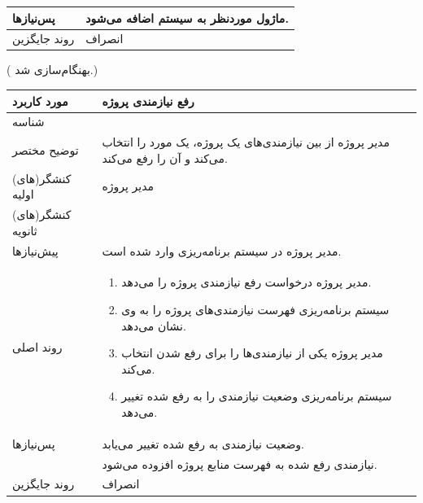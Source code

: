 \begin{table}[H]
\begin{tabular}{|p{3cm}|p{10cm}|}
		پس‌نیازها &
		ماژول موردنظر به سیستم اضافه می‌شود. \\
		
		\hline
		
		روند جایگزین
		& انصراف \\
		\hline
		
	\end{tabular}
\end{table}

({\color{red} بهنگام‌سازی شد.})
\begin{table}[H]
	\centering
	\begin{tabular}{|p{3cm}|p{10cm}|}
		\hline
		
		مورد کاربرد	& رفع نیازمندی پروژه \\
		\hline
		
		شناسه & 
		\stepcounter{usecase_ID}
		
		\arabic{usecase_ID} \\
		
		\hline
		
		توضیح مختصر & مدیر پروژه از بین نیازمندی‌های یک پروژه، یک مورد را انتخاب می‌کند و آن را رفع می‌کند. \\
		\hline
		
		کنشگر(های) اولیه & مدیر پروژه \\
		\hline
		
		کنشگر(های) ثانویه&  \\
		\hline
		
		پیش‌نیازها &
		مدیر پروژه در سیستم برنامه‌ریزی وارد شده است.\\
		\hline
		
		
		روند اصلی &
		\begin{enumerate}[topsep=0cm,leftmargin=0.5cm]
			\item مدیر پروژه درخواست رفع نیازمندی پروژه را می‌دهد.
			\item سیستم برنامه‌ریزی فهرست نیازمندی‌های پروژه را به وی نشان می‌دهد.
			\item مدیر پروژه یکی از نیازمندی‌ها را برای رفع شدن انتخاب می‌کند.
			\item سیستم برنامه‌ریزی وضعیت نیازمندی را به رفع شده تغییر می‌دهد.
		\end{enumerate} \\
		\hline
		
		پس‌نیازها &
		وضعیت نیازمندی به رفع شده تغییر می‌یابد. \\
		& نیازمندی رفع شده به فهرست منابع پروژه افزوده می‌شود.\\
		
		\hline
		روند جایگزین
		& انصراف \\
		\hline
	\end{tabular}
\end{table}


